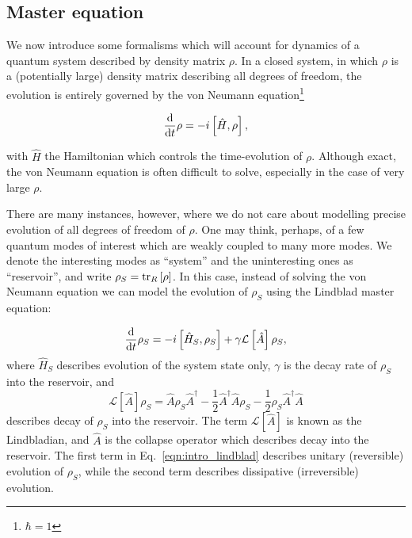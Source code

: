 \FloatBarrier
\subsection{Master equation}

We now introduce some formalisms which will account for dynamics of a quantum system described by density matrix $\rho$. In a closed system, in which $\rho$ is a (potentially large) density matrix describing all degrees of freedom, the evolution is entirely governed by the von Neumann equation\footnote{$\hbar = 1$}

\begin{equation}
\frac{\mathrm{d}}{\mathrm{d}t} \rho = - i \left[\hat{H}, \rho \right],
\end{equation}

\noindent with $\hat{H}$ the Hamiltonian which controls the time-evolution of $\rho$. Although exact, the von Neumann equation is often difficult to solve, especially in the case of very large $\rho$.

There are many instances, however, where we do not care about modelling precise evolution of all degrees of freedom of $\rho$. One may think, perhaps, of a few quantum modes of interest which are weakly coupled to many more modes. We denote the interesting modes as ``system'' and the uninteresting ones as ``reservoir'', and write $\rho_S = \tr_R\left[\rho\right]$. In this case, instead of solving the von Neumann equation we can model the evolution of $\rho_S$ using the Lindblad master equation:

\begin{equation}\label{eqn:intro_lindblad}
\frac{\mathrm{d}}{\mathrm{d}t} \rho_S = - i \left[ \hat{H}_S, \rho_S \right] + \gamma \mathcal{L}\left[\hat{A}\right] \rho_S,
\end{equation}
where $\hat{H}_S$ describes evolution of the system state only, $\gamma$ is the decay rate of $\rho_S$ into the reservoir, and 
\begin{equation}
\mathcal{L}\left[\hat{A}\right] \rho_S = \hat{A} \rho_S \hat{A}^\dagger - \frac{1}{2} \hat{A}^\dagger \hat{A} \rho_S - \frac{1}{2} \rho_S \hat{A}^\dagger \hat{A}
\end{equation}
describes decay of $\rho_S$ into the reservoir. The term $\mathcal{L}\left[\hat{A}\right]$ is known as the Lindbladian, and $\hat{A}$ is the collapse operator which describes decay into the reservoir. The first term in Eq.~\ref{eqn:intro_lindblad} describes unitary (reversible) evolution of $\rho_S$, while the second term describes dissipative (irreversible) evolution.

